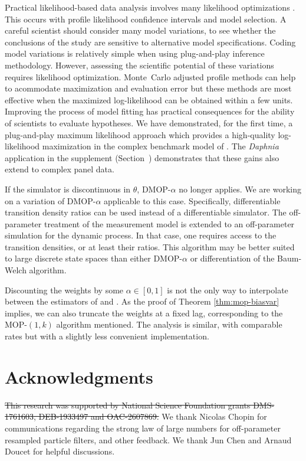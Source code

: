 \documentclass[11pt]{article}
\begin{document}
Practical likelihood-based data analysis involves many likelihood optimizations \citep{king08,blake14,pons-salort18,subramanian21,fox22,drake23}.
This occurs with profile likelihood confidence intervals and model selection. A careful scientist should consider many model variations, to see whether the conclusions of the study are sensitive to alternative model specifications.
Coding model variations is relatively simple when using plug-and-play inference methodology.
However, assessing the scientific potential of these variations requires likelihood optimization.
Monte~Carlo adjusted profile methods can help to acommodate maximization and evaluation error \citep{ionides17,ning21} but these methods are most effective when the maximized log-likelihood can be obtained within a few units.
Improving the process of model fitting has practical consequences for the ability of scientists to evaluate hypotheses.
We have demonstrated, for the first time, a plug-and-play maximum likelihood approach which provides a high-quality log-likelihood maximization in the complex benchmark model of \cite{king08}.
The \textit{Daphnia} application in the supplement (Section~\suppSecDaphnia) demonstrates that these gains also extend to complex panel data.


If the simulator is discontinuous in $\theta$, DMOP-$\alpha$ no longer applies.
We are working on a variation of DMOP-$\alpha$ applicable to this case.
Specifically, differentiable transition density ratios can be used instead of a differentiable simulator.
The off-parameter treatment of the measurement model is extended to an off-parameter simulation for the dynamic process.
In that case, one requires access to the transition densities, or at least their ratios. 
This algorithm may be better suited to large discrete state spaces than either DMOP-$\alpha$ or differentiation of the Baum-Welch algorithm.

Discounting the weights by some $\alpha \in [0,1]$ is not the only way to interpolate between the estimators of \cite{naesseth18} and \cite{poyiadjis11}. 
As the proof of Theorem \ref{thm:mop-biasvar} implies, we can also truncate the weights at a fixed lag, corresponding to the MOP-$(1,k)$ algorithm mentioned. 
The analysis is similar, with comparable rates but with a slightly less convenient implementation. 

\section*{Acknowledgments}
\sout{This research was supported by National Science Foundation grants DMS-1761603, DEB-1933497 and OAC-2607869.}
We thank Nicolas Chopin for communications regarding the strong law of large numbers for off-parameter resampled particle filters, and other feedback. We thank Jun Chen and Arnaud Doucet for helpful discussions.
{\editAIstatement}
\end{document}
